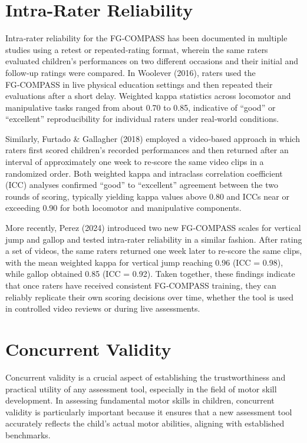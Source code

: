 \documentclass[
  letterpaper,
  DIV=11,
  numbers=noendperiod]{scrreprt}
\begin{document}
\chapter{Intra-Rater Reliability}\label{intra-rater-reliability}

Intra‑rater reliability for the FG‑COMPASS has been documented in
multiple studies using a retest or repeated‑rating format, wherein the
same raters evaluated children's performances on two different occasions
and their initial and follow‑up ratings were compared. In Woolever
(2016), raters used the FG‑COMPASS in live physical education settings
and then repeated their evaluations after a short delay. Weighted kappa
statistics across locomotor and manipulative tasks ranged from about
0.70 to 0.85, indicative of ``good'' or ``excellent'' reproducibility
for individual raters under real‑world conditions.

Similarly, Furtado \& Gallagher (2018) employed a video‑based approach
in which raters first scored children's recorded performances and then
returned after an interval of approximately one week to re‑score the
same video clips in a randomized order. Both weighted kappa and
intraclass correlation coefficient (ICC) analyses confirmed ``good'' to
``excellent'' agreement between the two rounds of scoring, typically
yielding kappa values above 0.80 and ICCs near or exceeding 0.90 for
both locomotor and manipulative components.

More recently, Perez (2024) introduced two new FG‑COMPASS scales for
vertical jump and gallop and tested intra‑rater reliability in a similar
fashion. After rating a set of videos, the same raters returned one week
later to re‑score the same clips, with the mean weighted kappa for
vertical jump reaching 0.96 (ICC = 0.98), while gallop obtained 0.85
(ICC = 0.92). Taken together, these findings indicate that once raters
have received consistent FG‑COMPASS training, they can reliably
replicate their own scoring decisions over time, whether the tool is
used in controlled video reviews or during live assessments.


\chapter{Concurrent Validity}\label{concurrent-validity}

Concurrent validity is a crucial aspect of establishing the
trustworthiness and practical utility of any assessment tool, especially
in the field of motor skill development. In assessing fundamental motor
skills in children, concurrent validity is particularly important
because it ensures that a new assessment tool accurately reflects the
child's actual motor abilities, aligning with established benchmarks.
\end{document}
